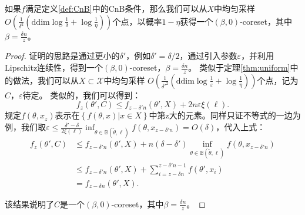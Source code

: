 \begin{theorem}
    如果$f$满足定义\ref{def:CnB}中的CnB条件，那么我们可以从$X$中均匀采样$O\left(\frac{1}{\delta^2}\left(\text{ddim}\log\frac 1 \delta+\log\frac{1}{\eta}\right)\right)$个点，以概率$1-\eta$获得一个$(\beta,0)$-coreset，其中$\beta=\frac{\delta n}{z}$。
    \label{thm:uniform final}
\end{theorem}

\begin{proof}
    证明的思路是通过更小的$\delta'$，例如$\delta'=\delta/2$，通过引入参数$\varepsilon$，并利用Lipschitz连续性，得到一个$(\beta,0)$-coreset，$\beta=\frac{\delta n}{z}$。
类似于定理\ref{thm:uniform}中的做法，我们可以从$X\subset \mathcal{X}$中均匀采样
$O\left(\frac{1}{\delta'^2}\left(\text{ddim}\log\frac 1 \varepsilon+\log\frac{1}{\eta}\right)\right)$个点，记为$C$，$\varepsilon$待定。
类似的，我们可以得到：
\begin{equation}
    f_z(\theta',C)\leq f_{z-\delta' n}(\theta',X)+2n\varepsilon\xi(\ell).
\end{equation}
规定$f(\theta,x_z)$表示在$\left\{f(\theta,x)|x\in X\right\}$中第z大的元素。同样只证不等式的一边为例，我们取$\varepsilon \leq\frac{\delta'-\delta}{2\xi(\ell)}\inf_{\theta\in\mathbb{B}(\tilde{\theta},\ell)}f(\theta,x_{z-\delta'n})=O(\delta)$，代入上式：
\begin{align*}
    f_z(\theta',C)&\leq f_{z-\delta' n}(\theta',X)+n(\delta-\delta')\inf_{\theta\in\mathbb{B}(\tilde{\theta},\ell)}f(\theta,x_{z-\delta'n})\\
    &\leq f_{z-\delta' n}(\theta',X)+\sum_{i=z-\delta n}^{z-\delta'n-1}f(\theta',x_i)\\
    &= f_{z-\delta n}(\theta',X).
\end{align*}

该结果说明了$C$是一个$(\beta,0)$-coreset，其中$\beta=\frac{\delta n }{z}$。
\end{proof}
